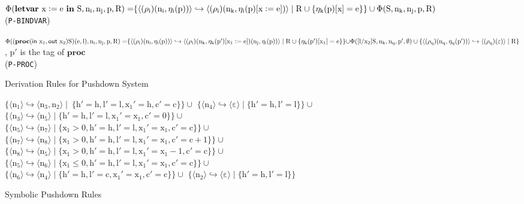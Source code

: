 \documentclass{llncs}
\begin{document}
\begin{figure*}[t]
\begin{minipage}[t]{4.8in}
$\mathrm{\Phi(\textbf{letvar}\ x\mathrel{\mathop:}= e\ \textbf{in}\ S,n_i,n_j,p,R)=}\\
\mathrm{\{\langle (\rho_i)(n_i,\eta_i(p))\rangle \hookrightarrow
\langle (\rho_i)(n_k,\eta_i(p)[x\mathrel{\mathop:}=
e])\rangle \mid R\cup \{\eta_k(p)[x]=e\}\}\cup \Phi(S,n_k,n_j,p,R)}$\\
\hspace*{\fill}(\texttt{P-BINDVAR})

$\mathrm{\Phi((\textbf{proc}(\textsf{in}\ x_1,\textsf{out}\ x_2)S)(e,l),n_i,n_j,p,R)=}\\
\hspace*{\fill}\mathrm{\{\langle (\rho_i)(n_i,\eta_i(p))\rangle
\hookrightarrow \langle
(\rho_i)(n_k,\eta_k(p')[x_1\mathrel{\mathop:}=
e])(n_j,\eta_i(p))\rangle \mid R\cup \{\eta_k(p')[x_1]=e\}\}}\\
\hspace*{\fill}\mathrm{\cup \Phi([l/x_2]S,n_k,n_q,p',\emptyset)\cup
\{\langle (\rho_q)(n_q,\eta_q(p'))\rangle \hookrightarrow \langle
(\rho_q)(\varepsilon)\rangle \mid R\}}$, $\mathrm{p'}$ is the tag of $\mathrm{\textbf{proc}}$\\
\hspace*{\fill}(\texttt{P-PROC})
\end{minipage}\caption{\label{fig:derivation}Derivation Rules for Pushdown System}
\end{figure*}
\begin{figure}[t]\footnotesize
\begin{minipage}[t]{4.8in}
$\mathrm{\{\langle n_1\rangle \hookrightarrow \langle n_3,n_2\rangle
\mid\ \{h'=h,l'=l,x_1'=h,c'=c\}\}\cup}$ $\mathrm{\{\langle
n_4\rangle \hookrightarrow \langle
\varepsilon\rangle \mid \{h'=h,l'=l\} \}\cup}$\\
$\mathrm{\{\langle n_3\rangle \hookrightarrow \langle n_5\rangle
\mid \{h'=h,l'=l,x_1'=x_1,c'=0\}\}\cup}$\\
$\mathrm{\{\langle n_5\rangle \hookrightarrow \langle n_7\rangle
\mid \{x_1>0,h'=h,l'=l,x_1'=x_1,c'=c\}\}\cup}$\\
$\mathrm{\{\langle n_7\rangle \hookrightarrow \langle n_8\rangle
\mid \{x_1>0,h'=h,l'=l,x_1'=x_1,c'=c+1\}\}\cup}$\\
$\mathrm{\{\langle n_8\rangle \hookrightarrow \langle n_5\rangle
\mid \{x_1>0,h'=h,l'=l,x_1'=x_1-1,c'=c\}\}\cup}$\\
$\mathrm{\{\langle n_5\rangle \hookrightarrow \langle n_6\rangle
\mid \{x_1\leq 0,h'=h,l'=l,x_1'=x_1,c'=c\}\}\cup}$\\
$\mathrm{\{\langle n_6\rangle \hookrightarrow \langle n_4\rangle
\mid \{h'=h,l'=c,x_1'=x_1,c'=c\}\}\cup}$ $\mathrm{\{\langle
n_2\rangle \hookrightarrow \langle \varepsilon\rangle \mid
\{h'=h,l'=l\} \}}$
\end{minipage}
\caption{\label{fig:example1}Symbolic Pushdown Rules}
\end{figure}
\end{document}
